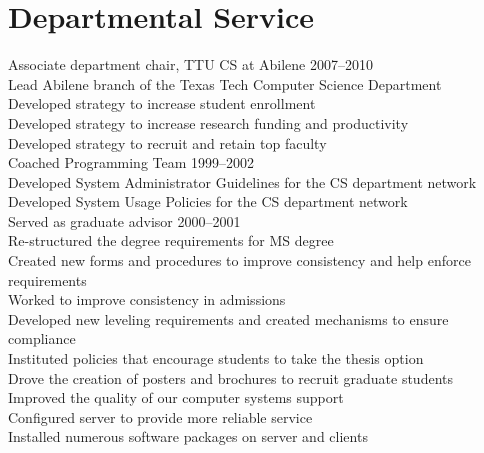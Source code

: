 \documentclass[10pt]{resume}
\begin{document}
\section{Departmental Service}{}
{
Associate department chair, TTU CS at Abilene 2007--2010\\
\hspace*{1em} Lead Abilene branch of the Texas Tech Computer Science Department\\
\hspace*{1em} Developed strategy to increase student enrollment\\
\hspace*{1em} Developed strategy to increase research funding and productivity\\
\hspace*{1em} Developed strategy to recruit and retain top faculty\\
Coached Programming Team 1999--2002\\
  Developed System Administrator Guidelines for the CS department network\\
  Developed System Usage Policies for the CS department network\\
 Served as graduate advisor 2000--2001\\
\hspace*{1em} Re-structured the degree requirements for MS degree\\
\hspace*{1em} Created new forms and procedures to improve consistency and help enforce requirements\\
\hspace*{1em} Worked to improve consistency in admissions\\
\hspace*{1em} Developed new leveling requirements and created mechanisms to ensure compliance\\
\hspace*{1em} Instituted policies that encourage students to take the thesis option\\
\hspace*{1em} Drove the creation of posters and brochures to recruit graduate students\\
Improved the quality of our computer systems support\\
\hspace*{1em} Configured server to provide more reliable service\\
\hspace*{1em} Installed numerous software packages on server and clients\\
}
\end{document}

